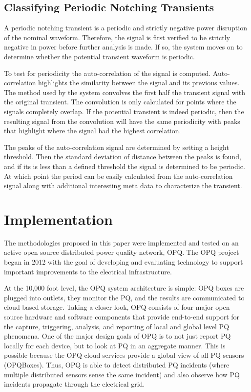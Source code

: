 \documentclass[10pt, conference, compsocconf]{IEEEtran}
\begin{document}
\subsection{Classifying Periodic Notching Transients}

A periodic notching transient is a periodic and strictly negative power disruption of the nominal waveform. Therefore, the signal is first verified to be strictly negative in power before further analysis is made. If so, the system moves on to determine whether the potential transient waveform is periodic.

To test for periodicity the auto-correlation of the signal is computed. Auto-correlation highlights the similarity between the signal and its previous values. The method used by the system convolves the first half the transient signal with the original transient. The convolution is only calculated for points where the signals completely overlap. If the potential transient is indeed periodic, then the resulting signal from the convolution will have the same periodicity with peaks that highlight where the signal had the highest correlation.

The peaks of the auto-correlation signal are determined by setting a height threshold. Then the standard deviation of distance between the peaks is found, and if its is less than a defined threshold the signal is determined to be periodic. At which point the period can be easily calculated from the auto-correlation signal along with additional interesting meta data to characterize the transient.

\section{Implementation}
\label{sec:Implementation}
The methodologies proposed in this paper were implemented and tested on an active open source distributed power quality network, OPQ. The OPQ project began in 2012 with the goal of developing and evaluating technology to support important improvements to the electrical infrastructure.

At the 10,000 foot level, the OPQ system architecture is simple: OPQ boxes are plugged into outlets, they monitor the PQ, and the results are communicated to cloud based storage. Taking a closer look, OPQ consists of four major open source hardware and software components that provide end-to-end support for the capture, triggering, analysis, and reporting of local and global level PQ phenomena. One of the major design goals of OPQ is to not just report PQ locally for each device, but to look at PQ in an aggregate manner. This is possible because the OPQ cloud services provide a global view of all PQ sensors (OPQBoxes). Thus, OPQ is able to detect distributed PQ incidents (where multiple distributed sensors sense the same incident) and also observe how PQ incidents propagate through the electrical grid.
\end{document}
